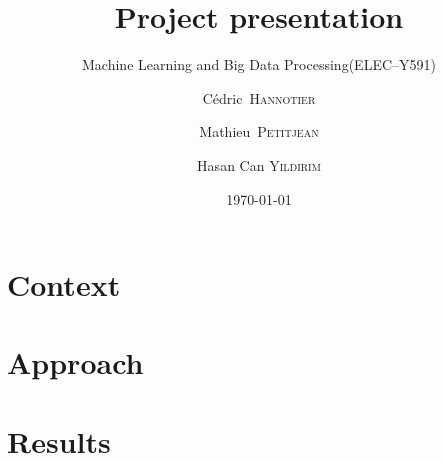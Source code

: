 \documentclass[english,10pt]{beamer}
\title[ELEC--Y591]{Project presentation}
\subtitle{\texorpdfstring{Machine Learning and Big Data Processing(\textsc{ELEC--Y591})}{(ELEC--Y591)}}
\author[Bruface]{Cédric~\textsc{Hannotier} \and Mathieu~\textsc{Petitjean} \and Hasan Can \textsc{Yildirim}}
\date{\today}
\begin{document}
\begin{frame}
  \titlepage
\end{frame}

\section[]{Context}


\section[]{Approach}


\section[]{Results}

\end{document}
